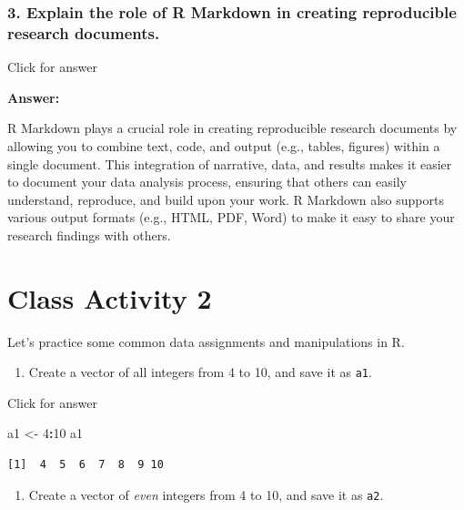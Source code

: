 \documentclass[
]{book}
\newenvironment{Shaded}{\begin{snugshade}}{\end{snugshade}}
\newcommand{\DecValTok}[1]{\textcolor[rgb]{0.00,0.00,0.81}{#1}}
\newcommand{\NormalTok}[1]{#1}
\newcommand{\OtherTok}[1]{\textcolor[rgb]{0.56,0.35,0.01}{#1}}
\newcommand{\SpecialCharTok}[1]{\textcolor[rgb]{0.81,0.36,0.00}{\textbf{#1}}}
\providecommand{\tightlist}{%
  \setlength{\itemsep}{0pt}\setlength{\parskip}{0pt}}
\begin{document}
\vspace*{0.5in}

\hypertarget{explain-the-role-of-r-markdown-in-creating-reproducible-research-documents.}{%
\subsection{3. Explain the role of R Markdown in creating reproducible research documents.}\label{explain-the-role-of-r-markdown-in-creating-reproducible-research-documents.}}

Click for answer

\textbf{Answer:}

R Markdown plays a crucial role in creating reproducible research documents by allowing you to combine text, code, and output (e.g., tables, figures) within a single document. This integration of narrative, data, and results makes it easier to document your data analysis process, ensuring that others can easily understand, reproduce, and build upon your work. R Markdown also supports various output formats (e.g., HTML, PDF, Word) to make it easy to share your research findings with others.

\hypertarget{class-activity-2}{%
\chapter{Class Activity 2}\label{class-activity-2}}

Let's practice some common data assignments and manipulations in R.

\begin{enumerate}
\def\labelenumi{\alph{enumi}.}
\tightlist
\item
  Create a vector of all integers from 4 to 10, and save it as \texttt{a1}.
\end{enumerate}

Click for answer

\begin{Shaded}
\begin{Highlighting}[]
\NormalTok{a1 }\OtherTok{\textless{}{-}} \DecValTok{4}\SpecialCharTok{:}\DecValTok{10}
\NormalTok{a1}
\end{Highlighting}
\end{Shaded}

\begin{verbatim}
[1]  4  5  6  7  8  9 10
\end{verbatim}

\begin{enumerate}
\def\labelenumi{\alph{enumi}.}
\setcounter{enumi}{1}
\tightlist
\item
  Create a vector of \emph{even} integers from 4 to 10, and save it as \texttt{a2}.
\end{enumerate}
\end{document}
